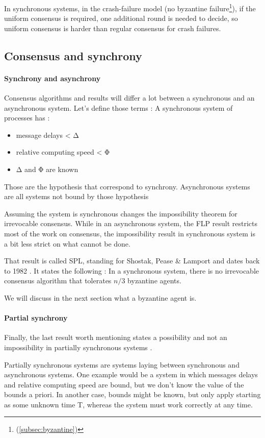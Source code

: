 \documentclass[11pt, twocolumn]{article}
\begin{document}
In synchronous systems, in the crash-failure model (no byzantine failure\footnote{ (\ref{subsec:byzantine})}), if the uniform consensus is required, one additional round is needed to decide, so uniform consensus is harder than regular consensus for crash failures.

\subsection{Consensus and synchrony}
\paragraph{Synchrony and asynchrony}

Consensus algorithms and results will differ a lot between a synchronous and an asynchronous system. Let's define those terms :
A synchronous system of processes has :
\begin{itemize}
    \item message delays < Δ
    \item relative computing speed < Φ
    \item Δ and Φ are known
\end{itemize}

Those are the hypothesis that correspond to synchrony.
Asynchronous systems are all systems not bound by those hypothesis

Assuming the system is synchronous changes the impossibility theorem for irrevocable consensus.
While in an asynchronous system, the FLP result restricts most of the work on consensus, the impossibility result in synchronous system is a bit less strict on what cannot be done.

That result is called SPL, standing for Shostak, Pease \& Lamport and dates back to 1982 \cite{byzantine}. It states the following :
In a synchronous system, there is no irrevocable consensus algorithm that tolerates \(n/3\) byzantine agents.

We will discuss in the next section what a byzantine agent is.

\paragraph{Partial synchrony}

Finally, the last result worth mentioning states a possibility and not an impossibility in partially synchronous systems \cite{partialSynchrony}.

Partially synchronous systems are systems laying between synchronous and asynchronous systems. One example would be a system in which messages delays and relative computing speed are bound, but we don't know the value of the bounds a priori. In another case, bounds might be known, but only apply starting as some unknown time T, whereas the system must work correctly at any time.
\end{document}
